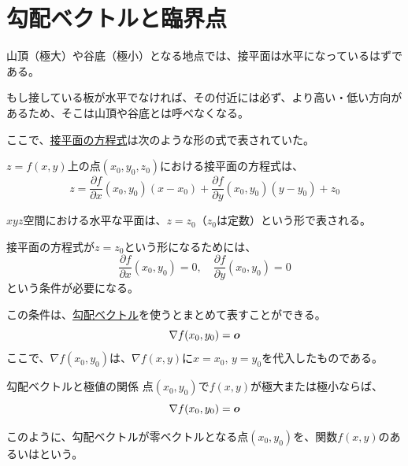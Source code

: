 \documentclass[../../../topic_calculus]{subfiles}
\begin{document}
\sectionline
\section{勾配ベクトルと臨界点}

山頂（極大）や谷底（極小）となる地点では、接平面は水平になっているはずである。

もし接している板が水平でなければ、その付近には必ず、より高い・低い方向があるため、そこは山頂や谷底とは呼べなくなる。

\br

ここで、\hyperref[thm:tangent-plane-equation]{接平面の方程式}は次のような形の式で表されていた。
\begin{review}
  $z=f(x,y)$上の点$(x_0,y_0,z_0)$における接平面の方程式は、
  \begin{equation*}
    z = \frac{\partial f}{\partial x}(x_0,y_0)(x - x_0) + \frac{\partial f}{\partial y}(x_0,y_0)(y - y_0) + z_0
  \end{equation*}
\end{review}

\br

$xyz$空間における水平な平面は、$z = z_0$（$z_0$は定数）という形で表される。

\br

接平面の方程式が$z = z_0$という形になるためには、
\begin{equation*}
  \frac{\partial f}{\partial x}(x_0,y_0) = 0, \quad
  \frac{\partial f}{\partial y}(x_0,y_0) = 0
\end{equation*}
という条件が必要になる。

\br

この条件は、\hyperref[def:gradient]{勾配ベクトル}を使うとまとめて表すことができる。
\begin{equation*}
  \nabla f(x_0,y_0) = \vb*{o}
\end{equation*}
ここで、$\nabla f(x_0,y_0)$は、$\nabla f(x,y)$に$x = x_0,\, y = y_0$を代入したものである。

\begin{theorem}{勾配ベクトルと極値の関係}
  点$(x_0,y_0)$で$f(x,y)$が極大または極小ならば、
  \begin{equation*}
    \nabla f(x_0,y_0) = \vb*{o}
  \end{equation*}
\end{theorem}

このように、勾配ベクトルが零ベクトルとなる点$(x_0,y_0)$を、関数$f(x,y)$のあるいはという。
\end{document}
